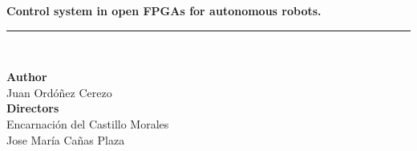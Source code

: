 \begin{titlepage}
 
 
\setlength{\centeroffset}{-0.5\oddsidemargin}
\addtolength{\centeroffset}{0.5\evensidemargin}
\thispagestyle{empty}

\noindent\hspace*{\centeroffset}\begin{minipage}{\textwidth}

\centering



 \vspace{3.3cm}

 \vspace{0.5cm}


{\Huge\bfseries  Control system in open FPGAs for autonomous robots.\\
}
\noindent\rule[-1ex]{\textwidth}{3pt}\\[3.5ex]
\end{minipage}

\vspace{2.5cm}
\noindent\hspace*{\centeroffset}\begin{minipage}{\textwidth}
\centering

\textbf{Author}\\ {Juan Ordóñez Cerezo}\\[2.5ex]
\textbf{Directors}\\
{Encarnación del Castillo Morales\\
Jose María Cañas Plaza}\\[2cm]
\end{minipage}

 
\end{titlepage}


